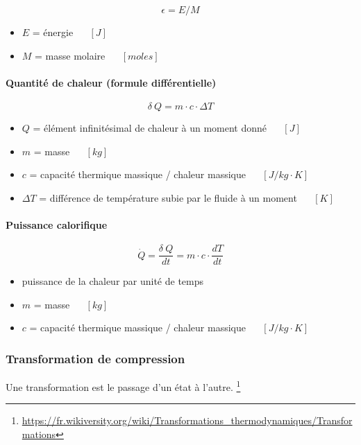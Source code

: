 \documentclass[]{article}
\providecommand{\tightlist}{%
  \setlength{\itemsep}{0pt}\setlength{\parskip}{0pt}}
\let\oldparagraph\paragraph
\renewcommand{\paragraph}[1]{\oldparagraph{#1}\mbox{}}
\begin{document}
$$ \epsilon = E / M $$

\begin{itemize}
\tightlist
\item
  $E$ = énergie ~~ $ [J] $
\item
  $M$ = masse molaire ~~ $ [moles] $
\end{itemize}

\paragraph{Quantité de chaleur (formule différentielle)}\label{quantituxe9-de-chaleur}

$$ \delta ~ Q = m \cdot c \cdot \Delta T $$ 

\begin{itemize}
\tightlist
\item
  $Q$ = élément infinitésimal de chaleur à un moment donné
  ~~ $ [ J ] $
\item
  $m$ = masse ~~ $ [kg] $
\item
  $c$ = capacité thermique massique / chaleur massique
  ~~ $ \left[ J / kg \cdot K \right] $
\item
  $\Delta T$ = différence de température subie par le fluide à un
  moment ~~ $ [ K ] $
\end{itemize}

\paragraph{Puissance calorifique}\label{puissance-calorifique}

$$ \dot{Q} = \dfrac{\delta ~ Q}{dt} = m \cdot c \cdot \dfrac{dT}{dt} $$

\begin{itemize}
\tightlist
\item
  puissance de la chaleur par unité de temps
\item
  $m$ = masse ~~ $ [kg] $
\item
  $c$ = capacité thermique massique / chaleur massique
  ~~ $ \left[ J / kg \cdot K \right] $
\end{itemize}

\subsubsection{Transformation de
compression}\label{transformation-de-compression}

Une transformation est le passage d’un état à l’autre. \footnote{\url{https://fr.wikiversity.org/wiki/Transformations\_thermodynamiques/Transformations}}
\end{document}

